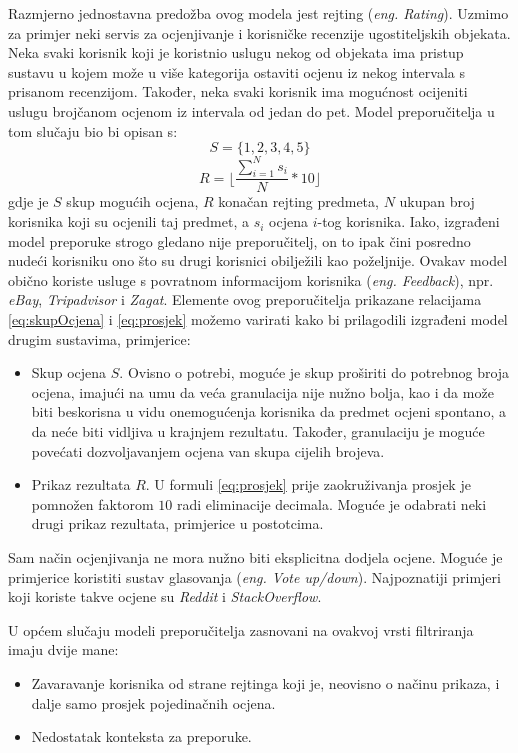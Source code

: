 \documentclass[times, utf8, diplomski, numeric]{fer}
\begin{document}
Razmjerno jednostavna predožba ovog modela jest rejting (\emph{eng. Rating}).
Uzmimo za primjer neki servis za ocjenjivanje i korisničke recenzije
ugostiteljskih objekata. Neka svaki korisnik koji je koristnio uslugu nekog od
objekata ima pristup sustavu u kojem može u više kategorija ostaviti ocjenu iz
nekog intervala s prisanom recenzijom. Također, neka svaki korisnik ima
mogućnost ocijeniti uslugu brojčanom ocjenom iz intervala od jedan do pet. Model
preporučitelja u tom slučaju bio bi opisan s:
\begin{equation}
\label{eq:skupOcjena}
	S = \{1, 2, 3, 4, 5\}
\end{equation}
\begin{equation}
\label{eq:prosjek}
	R = \lfloor \frac{\sum_{i=1}^{N} s_i}{N} \ast 10 \rfloor
\end{equation}
gdje je $S$ skup mogućih ocjena, $R$ konačan rejting predmeta, $N$ ukupan broj
korisnika koji su ocjenili taj predmet, a $s_i$ ocjena $i$-tog korisnika. Iako,
izgrađeni model preporuke strogo gledano nije preporučitelj, on to ipak čini
posredno nudeći korisniku ono što su drugi korisnici obilježili kao poželjnije.
Ovakav model obično koriste usluge s povratnom informacijom korisnika
(\emph{eng. Feedback}), npr. \emph{eBay}, \emph{Tripadvisor} i \emph{Zagat}.
Elemente ovog preporučitelja prikazane relacijama \ref{eq:skupOcjena} i
\ref{eq:prosjek} možemo varirati kako bi prilagodili izgrađeni model drugim
sustavima, primjerice:
\begin{itemize}
  \item Skup ocjena $S$. Ovisno o potrebi, moguće je skup proširiti do potrebnog
  broja ocjena, imajući na umu da veća granulacija nije nužno bolja, kao i da
  može biti beskorisna u vidu onemogućenja korisnika da predmet ocjeni spontano,
  a da neće biti vidljiva u krajnjem rezultatu. Također, granulaciju je moguće
  povećati dozvoljavanjem ocjena van skupa cijelih brojeva.
  \item Prikaz rezultata $R$. U formuli \ref{eq:prosjek} prije zaokruživanja
  prosjek je pomnožen faktorom $10$ radi eliminacije decimala. Moguće je
  odabrati neki drugi prikaz rezultata, primjerice u postotcima.
\end{itemize}
Sam način ocjenjivanja ne mora nužno biti eksplicitna dodjela ocjene. Moguće je
primjerice koristiti sustav glasovanja  (\emph{eng. Vote
up/down}).
Najpoznatiji primjeri koji koriste takve ocjene su \emph{Reddit} i \emph{StackOverflow}.

U općem slučaju modeli preporučitelja zasnovani na ovakvoj vrsti filtriranja
imaju dvije mane:
\begin{itemize}
  \item Zavaravanje korisnika od strane rejtinga koji je, neovisno o načinu
  prikaza, i dalje samo prosjek pojedinačnih ocjena.
  \item Nedostatak konteksta za preporuke.
\end{itemize}
\end{document}
